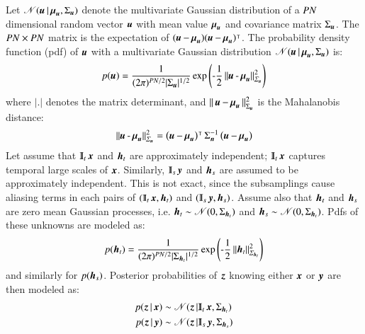 Let $\mathscr{N}(\operatorname{\boldsymbol{u}}|\operatorname{\boldsymbol{\mu}}_{\operatorname{\boldsymbol{u}}},\Sigma_{\operatorname{\boldsymbol{u}}}) $ denote the multivariate Gaussian distribution of a $ P N $ dimensional random vector $ \operatorname{\boldsymbol{u}} $ with mean value $ \operatorname{\boldsymbol{\mu}}_{\operatorname{\boldsymbol{u}}} $ and covariance matrix $\Sigma_{\operatorname{\boldsymbol{u}}}$.
The $ P N \times P N $ matrix is the expectation of $ (\operatorname{\boldsymbol{u}}-\operatorname{\boldsymbol{\mu}}_{\operatorname{\boldsymbol{u}}} )(\operatorname{\boldsymbol{u}}-\operatorname{\boldsymbol{\mu}}_{\operatorname{\boldsymbol{u}}} )^{\intercal} $. 
The probability density function (pdf) of $ \operatorname{\boldsymbol{u}} $ with a multivariate Gaussian distribution $ \mathscr{N}(\operatorname{\boldsymbol{u}}|\operatorname{\boldsymbol{\mu}}_{\operatorname{\boldsymbol{u}}},\Sigma_{\operatorname{\boldsymbol{u}}}) $ is:
\begin{equation}
	p(\mybold{u})=\frac{1}{(2\pi)^{\dimsh \dimth/2}|\Sigma_{\mybold{u}}|^{1/2}} \myexp{-\frac{1}{2} \Mdist{\mybold{u}-\mybold{\mu}_{\mybold{u}}}{\Sigma_{\mybold{u}}}}
	\label{eq:Bayes4}
\end{equation} 
where $ |.| $ denotes the matrix determinant, and $\Arrowvert \operatorname{\boldsymbol{u}}-\operatorname{\boldsymbol{\mu}}_{\operatorname{\boldsymbol{u}}} \Arrowvert^2_{\Sigma_{\operatorname{\boldsymbol{u}}}}$ is the Mahalanobis distance:
\begin{equation}
 \operatorname{\Arrowvert \mathit{\operatorname{\boldsymbol{u}}-\operatorname{\boldsymbol{\mu}}_{\operatorname{\boldsymbol{u}}}} \Arrowvert^2_{\mathit{\Sigma_{\operatorname{\boldsymbol{u}}}}} } = \left(\operatorname{\boldsymbol{u}}-\operatorname{\boldsymbol{\mu}}_{\operatorname{\boldsymbol{u}}}\right)^{\intercal} \Sigma_{\operatorname{\boldsymbol{n}}}^{-1}\left( \operatorname{\boldsymbol{u}}-\operatorname{\boldsymbol{\mu}}_{\operatorname{\boldsymbol{u}}}\right)
\end{equation}
Let assume that $ \Interp_t\x  $ and $ \operatorname{\boldsymbol{h}}_t $ are approximately independent; $ \Interp_t\x  $ captures temporal large scales of $ \operatorname{\boldsymbol{x}}  $. Similarly, $ \Interp_s\y  $ and $ \operatorname{\boldsymbol{h}}_s $ are assumed to be approximately independent. This is not exact, since the subsamplings cause aliasing terms in each pairs of $ (\Interp_t\x , \h_t) $ and $ (\Interp_s\y , \h_s) $. Assume also that $ \operatorname{\boldsymbol{h}}_t $ and $ \operatorname{\boldsymbol{h}}_s $ are zero mean Gaussian processes, i.e. $ \operatorname{\boldsymbol{h}}_t \sim \mathscr{N} (0,\Sigma_{\operatorname{\boldsymbol{h}}_t}) $ and $ \operatorname{\boldsymbol{h}}_s \sim \mathscr{N} (0,\Sigma_{\operatorname{\boldsymbol{h}}_t}) $. Pdfs of these unknowns are modeled as:
\begin{equation}
	p(\h_t)=\frac{1}{(2\pi)^{\dimsh \dimth/2}|\Sigma_{\h_t}|^{1/2}} \myexp{ -\frac{1}{2} \Mdist{\h_t}{\Sigma_{\h_t}}}
	\label{eq:Bayes5}
\end{equation} 
and similarly for $ p(\operatorname{\boldsymbol{h}}_s) $. Posterior probabilities of $ \operatorname{\boldsymbol{z}}  $ knowing either $ \operatorname{\boldsymbol{x}}  $ or $ \operatorname{\boldsymbol{y}}  $ are then modeled as:
\begin{align}
	p(\z |\x ) &\sim \distr(\z |\Interp_t\x ,\Sigma_{\h_t}) \label{eq:Bayes21} \\
	p(\z |\y ) &\sim \distr(\z |\Interp_s\y ,\Sigma_{\h_s}) \label{eq:Bayes22}	
\end{align}

